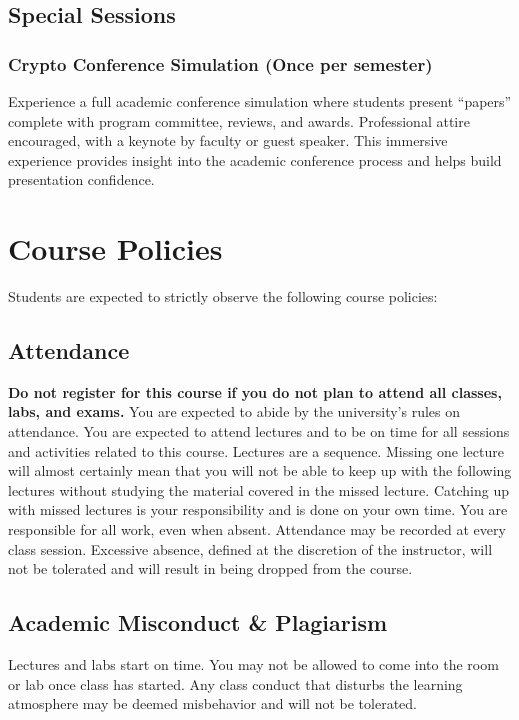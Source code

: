 \documentclass[10pt,a4paper,american]{exam}
\begin{document}
\subsection{Special Sessions}

\subsubsection*{Crypto Conference Simulation (Once per semester)}
Experience a full academic conference simulation where students present ``papers'' complete with program committee, reviews, and awards. Professional attire encouraged, with a keynote by faculty or guest speaker. This immersive experience provides insight into the academic conference process and helps build presentation confidence.

\section{Course Policies}
Students are expected to strictly observe the following course policies:

\subsection{Attendance}
\textbf{Do not register for this course if you do not plan to attend all classes, labs, and exams.} You are expected to abide by the university's rules on attendance. You are expected to attend lectures and to be on time for all sessions and activities related to this course. Lectures are a sequence. Missing one lecture will almost certainly mean that you will not be able to keep up with the following lectures without studying the material covered in the missed lecture. Catching up with missed lectures is your responsibility and is done on your own time. You are responsible for all work, even when absent. Attendance may be recorded at every class session. Excessive absence, defined at the discretion of the instructor, will not be tolerated and will result in being dropped from the course.

\subsection{Academic Misconduct \& Plagiarism}
Lectures and labs start on time. You may not be allowed to come into the room or lab once class has started. Any class conduct that disturbs the learning atmosphere may be deemed misbehavior and will not be tolerated.
\end{document}
